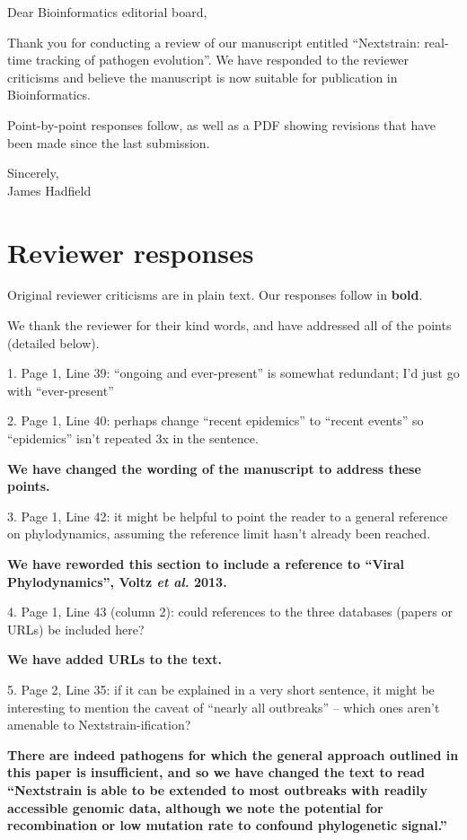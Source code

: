 \documentclass[11pt,oneside,letterpaper]{article}
\begin{document}

Dear Bioinformatics editorial board,

Thank you for conducting a review of our manuscript entitled ``Nextstrain: real-time tracking of pathogen evolution''.  We have responded to the reviewer criticisms and believe the manuscript is now suitable for publication in Bioinformatics.

Point-by-point responses follow, as well as a PDF showing revisions that have been made since the last submission.

Sincerely,\\
James Hadfield

\restoregeometry

\newpage

\section*{Reviewer responses}

Original reviewer criticisms are in plain text.  Our responses follow in \textbf{bold}.

We thank the reviewer for their kind words, and have addressed all of the points (detailed below).

1. Page 1, Line 39: ``ongoing and ever-present'' is somewhat redundant; I'd just go with ``ever-present''

2. Page 1, Line 40: perhaps change ``recent epidemics'' to ``recent events'' so ``epidemics'' isn't repeated 3x in the sentence.

\textbf{We have changed the wording of the manuscript to address these points.}

3. Page 1, Line 42: it might be helpful to point the reader to a general reference on phylodynamics, assuming the reference limit hasn't already been reached.

\textbf{We have reworded this section to include a reference to ``Viral Phylodynamics'', Voltz \textit{et al.} 2013.}

4. Page 1, Line 43 (column 2): could references to the three databases (papers or URLs) be included here?

\textbf{We have added URLs to the text.}

5. Page 2, Line 35: if it can be explained in a very short sentence, it might be interesting to mention the caveat of ``nearly all outbreaks'' -- which ones aren't amenable to Nextstrain-ification?

\textbf{There are indeed pathogens for which the general approach outlined in this paper is insufficient, and so we have changed the text to read ``Nextstrain is able to be extended to most outbreaks with readily accessible genomic data, although we note the potential for recombination or low mutation rate to confound phylogenetic signal.''}
\end{document}
